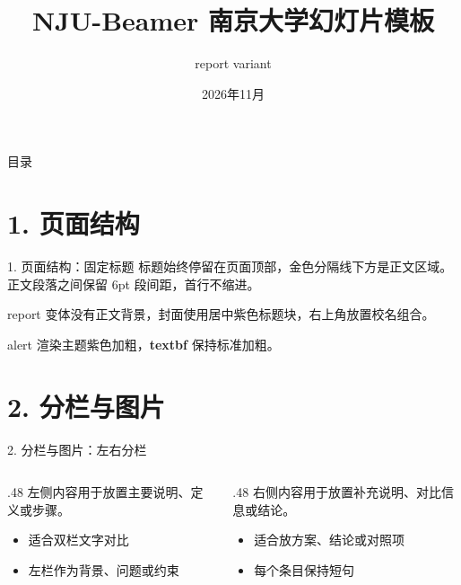 \documentclass[aspectratio=169,10pt]{beamer}
\title[NJU-Beamer]{NJU-Beamer 南京大学幻灯片模板}
\subtitle{report variant}
\date{2026年11月}
\begin{document}
\NJUtitleframe

\begin{frame}{目录}
  \tableofcontents
\end{frame}

\section{1. 页面结构}

\begin{frame}{1. 页面结构：固定标题}
标题始终停留在页面顶部，金色分隔线下方是正文区域。正文段落之间保留 6pt 段间距，首行不缩进。

report 变体没有正文背景，封面使用居中紫色标题块，右上角放置校名组合。


\alert{alert} 渲染主题紫色加粗，\textbf{textbf} 保持标准加粗。
\end{frame}

\section{2. 分栏与图片}

\begin{frame}{2. 分栏与图片：左右分栏}
\begin{columns}[T,onlytextwidth]
  \begin{column}{.48\textwidth}
    左侧内容用于放置主要说明、定义或步骤。
    \begin{itemize}
      \item 适合双栏文字对比
      \item 左栏作为背景、问题或约束
    \end{itemize}
  \end{column}
  \begin{column}{.48\textwidth}
    右侧内容用于放置补充说明、对比信息或结论。
    \begin{itemize}
      \item 适合放方案、结论或对照项
      \item 每个条目保持短句
    \end{itemize}
  \end{column}
\end{columns}
\end{frame}
\end{document}
